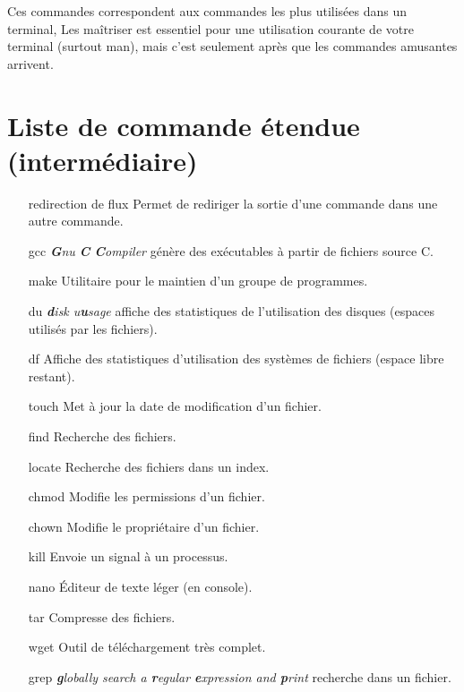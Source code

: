 \documentclass[french, a4paper, 12pt, titlepage]{article}
\begin{document}
Ces commandes correspondent aux commandes les plus utilisées dans un terminal,
Les maîtriser est essentiel pour une utilisation courante de votre terminal (surtout man), mais c'est seulement après que les commandes amusantes arrivent.

\newpage

\section{Liste de commande étendue (intermédiaire)}
\begin{enumerate}
\item[redirection de flux] Permet de rediriger la sortie d'une commande dans une autre commande.
\item[gcc] \emph{\textbf{G}nu \textbf{C} \textbf{C}ompiler}  génère des exécutables à partir de fichiers source C.
\item[make] Utilitaire pour le maintien d'un groupe de programmes.
\item[du] \emph{\textbf{d}isk u\textbf{u}sage} affiche des statistiques de l'utilisation des disques (espaces utilisés par les fichiers).
\item[df] Affiche des statistiques d'utilisation des systèmes de fichiers (espace libre restant).
\item[touch] Met à jour la date de modification d'un fichier.
\item[find] Recherche des fichiers.
\item[locate] Recherche des fichiers dans un index.
\item[chmod] Modifie les permissions d'un fichier.
\item[chown] Modifie le propriétaire d'un fichier.
\item[kill] Envoie un signal à un processus.
\item[nano] Éditeur de texte léger (en console).
\item[tar] Compresse des fichiers.
\item[wget] Outil de téléchargement très complet.
\item[grep] \emph{\textbf{g}lobally search a \textbf{r}egular \textbf{e}xpression and \textbf{p}rint} recherche dans un fichier.
\end{enumerate}















\newpage
\end{document}
